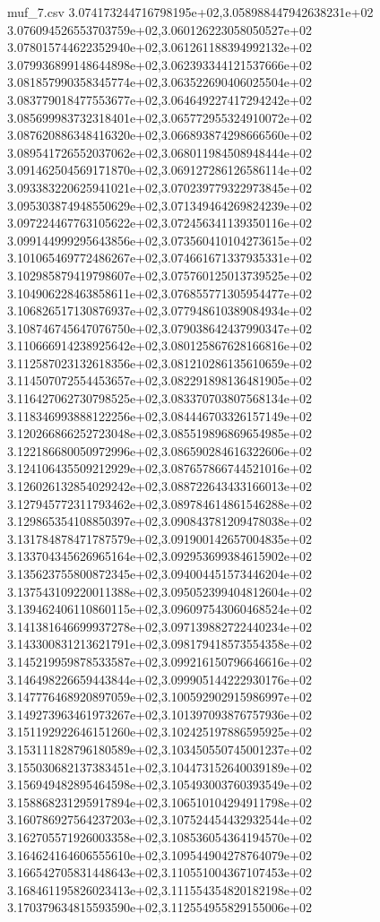\begin{filecontents*}{muf_7.csv}
3.074173244716798195e+02,3.058988447942638231e+02
3.076094526553703759e+02,3.060126223058050527e+02
3.078015744622352940e+02,3.061261188394992132e+02
3.079936899148644898e+02,3.062393344121537666e+02
3.081857990358345774e+02,3.063522690406025504e+02
3.083779018477553677e+02,3.064649227417294242e+02
3.085699983732318401e+02,3.065772955324910072e+02
3.087620886348416320e+02,3.066893874298666560e+02
3.089541726552037062e+02,3.068011984508948444e+02
3.091462504569171870e+02,3.069127286126586114e+02
3.093383220625941021e+02,3.070239779322973845e+02
3.095303874948550629e+02,3.071349464269824239e+02
3.097224467763105622e+02,3.072456341139350116e+02
3.099144999295643856e+02,3.073560410104273615e+02
3.101065469772486267e+02,3.074661671337935331e+02
3.102985879419798607e+02,3.075760125013739525e+02
3.104906228463858611e+02,3.076855771305954477e+02
3.106826517130876937e+02,3.077948610389084934e+02
3.108746745647076750e+02,3.079038642437990347e+02
3.110666914238925642e+02,3.080125867628166816e+02
3.112587023132618356e+02,3.081210286135610659e+02
3.114507072554453657e+02,3.082291898136481905e+02
3.116427062730798525e+02,3.083370703807568134e+02
3.118346993888122256e+02,3.084446703326157149e+02
3.120266866252723048e+02,3.085519896869654985e+02
3.122186680050972996e+02,3.086590284616322606e+02
3.124106435509212929e+02,3.087657866744521016e+02
3.126026132854029242e+02,3.088722643433166013e+02
3.127945772311793462e+02,3.089784614861546288e+02
3.129865354108850397e+02,3.090843781209478038e+02
3.131784878471787579e+02,3.091900142657004835e+02
3.133704345626965164e+02,3.092953699384615902e+02
3.135623755800872345e+02,3.094004451573446204e+02
3.137543109220011388e+02,3.095052399404812604e+02
3.139462406110860115e+02,3.096097543060468524e+02
3.141381646699937278e+02,3.097139882722440234e+02
3.143300831213621791e+02,3.098179418573554358e+02
3.145219959878533587e+02,3.099216150796646616e+02
3.146498226659443844e+02,3.099905144222930176e+02
3.147776468920897059e+02,3.100592902915986997e+02
3.149273963461973267e+02,3.101397093876757936e+02
3.151192922646151260e+02,3.102425197886595925e+02
3.153111828796180589e+02,3.103450550745001237e+02
3.155030682137383451e+02,3.104473152640039189e+02
3.156949482895464598e+02,3.105493003760393549e+02
3.158868231295917894e+02,3.106510104294911798e+02
3.160786927564237203e+02,3.107524454432932544e+02
3.162705571926003358e+02,3.108536054364194570e+02
3.164624164606555610e+02,3.109544904278764079e+02
3.166542705831448643e+02,3.110551004367107453e+02
3.168461195826023413e+02,3.111554354820182198e+02
3.170379634815593590e+02,3.112554955829155006e+02

\end{filecontents*}
